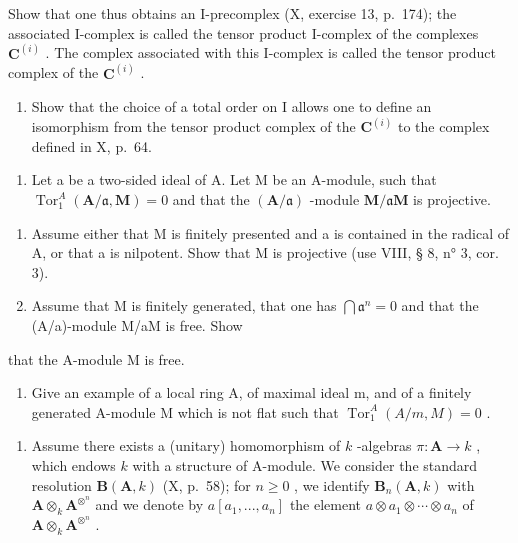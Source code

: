 Show that one thus obtains an I-precomplex (X, exercise 13, p.~174); the associated I-complex is called the tensor product I-complex of the complexes \(\mathbf{C}^{(i)}\) . The complex associated with this I-complex is called the tensor product complex of the \(\mathbf{C}^{(i)}\) .

\begin{enumerate}
\def\labelenumi{\alph{enumi})}
\setcounter{enumi}{1}
\tightlist
\item
  Show that the choice of a total order on I allows one to define an isomorphism from the tensor product complex of the \(\mathbf{C}^{(i)}\) to the complex defined in X, p.~64.
\end{enumerate}

\begin{enumerate}
\def\labelenumi{\arabic{enumi})}
\setcounter{enumi}{3}
\tightlist
\item
  Let a be a two-sided ideal of A. Let M be an A-module, such that \(\operatorname{Tor}_1^A (\mathbf{A} / \mathfrak{a},\mathbf{M}) = 0\) and that the \((\mathbf{A} / \mathfrak{a})\) -module \(\mathbf{M} / \mathfrak{a}\mathbf{M}\) is projective.
\end{enumerate}

\begin{enumerate}
\def\labelenumi{\alph{enumi})}
\item
  Assume either that M is finitely presented and a is contained in the radical of A, or that a is nilpotent. Show that M is projective (use VIII, § 8, n° 3, cor. 3).
\item
  Assume that M is finitely generated, that one has \(\bigcap \mathfrak{a}^n = 0\) and that the (A/a)-module M/aM is free. Show
\end{enumerate}

that the A-module M is free.

\begin{enumerate}
\def\labelenumi{\alph{enumi})}
\setcounter{enumi}{2}
\tightlist
\item
  Give an example of a local ring A, of maximal ideal m, and of a finitely generated A-module M which is not flat such that \(\operatorname{Tor}_{1}^{A}(A/m, M) = 0\) .
\end{enumerate}

\begin{enumerate}
\def\labelenumi{\arabic{enumi})}
\setcounter{enumi}{4}
\tightlist
\item
  Assume there exists a (unitary) homomorphism of \(k\) -algebras \(\pi: \mathbf{A} \to k\) , which endows \(k\) with a structure of A-module. We consider the standard resolution \(\mathbf{B}(\mathbf{A}, k)\) (X, p.~58); for \(n \geqslant 0\) , we identify \(\mathbf{B}_n(\mathbf{A}, k)\) with \(\mathbf{A} \otimes_k \mathbf{A}^{\otimes^n}\) and we denote by \(a[a_1, ..., a_n]\) the element \(a \otimes a_1 \otimes \cdots \otimes a_n\) of \(\mathbf{A} \otimes_k \mathbf{A}^{\otimes^n}\) .
\end{enumerate}

